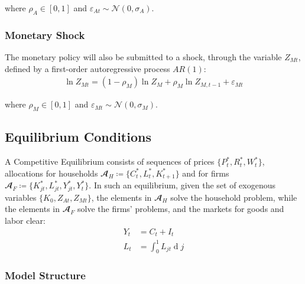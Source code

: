 \documentclass[
	12pt, 
	]{article}
\numberwithin{equation}{section}
\DeclareMathOperator{\dif}{d}
\theoremstyle{definition}
\theoremstyle{plain}
\theoremstyle{plain}
\theoremstyle{plain}
\begin{document}
where $\rho_A \in [0,1]$ and $\varepsilon_{At} \sim \mathscr{N}(0,\sigma_A)$.

\subsubsection*{Monetary Shock} \label{sec:monetary shock}

The monetary policy will also be submitted to a shock, through the variable $Z_{Mt}$, defined by a first-order autoregressive process $AR(1)$:
\begin{align}
	\ln{Z_{Mt}} = (1-\rho_M)\ln{Z_{M}} + \rho_M\ln{Z_{M,t-1}} + \varepsilon_{Mt} \label{eq:monetary-shock}
\end{align}

where $\rho_M \in [0,1]$ and $\varepsilon_{Mt} \sim \mathscr{N}(0,\sigma_M)$.


\subsection{Equilibrium Conditions}


A Competitive Equilibrium consists of sequences of prices $\{P_t^\ast, R_t^\ast, W_t^\ast\}$, allocations for households $\mathbfscr{A}_H \coloneq \{C_t^\ast, L_t^\ast, K_{t+1}^\ast\}$ and for firms $\mathbfscr{A}_F \coloneq \{K_{jt}^\ast, L_{jt}^\ast, Y_{jt}^\ast, Y_t^\ast\}$. In such an equilibrium, given the set of exogenous variables $\{K_0, Z_{At}, Z_{Mt}\}$, the elements in $\mathbfscr{A}_H$ solve the household problem, while the elements in $\mathbfscr{A}_F$ solve the firms' problems, and the markets for goods and labor clear:
\begin{align}
	Y_t &= C_t + I_t \label{eq:market-clearing-condition} \\
	L_t &= \int_{0}^{1} L_{jt} \dif j \label{eq:market-clearing-condition-2}
\end{align}



\subsubsection{Model Structure}
\end{document}
